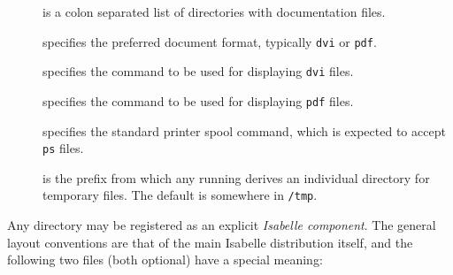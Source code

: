 \begin{isabellebody}
\begin{isamarkuptext}
\begin{description}
  \item[\hypertarget{setting.ISABELLE-DOCS}{\hyperlink{setting.ISABELLE-DOCS}{\mbox{}}}] is a colon separated list of
  directories with documentation files.
  
  \item[\hypertarget{setting.ISABELLE-DOC-FORMAT}{\hyperlink{setting.ISABELLE-DOC-FORMAT}{\mbox{}}}] specifies the preferred
  document format, typically \verb|dvi| or \verb|pdf|.
  
  \item[\hypertarget{setting.DVI-VIEWER}{\hyperlink{setting.DVI-VIEWER}{\mbox{}}}] specifies the command to be used
  for displaying \verb|dvi| files.
  
  \item[\hypertarget{setting.PDF-VIEWER}{\hyperlink{setting.PDF-VIEWER}{\mbox{}}}] specifies the command to be used
  for displaying \verb|pdf| files.
  
  \item[\hypertarget{setting.PRINT-COMMAND}{\hyperlink{setting.PRINT-COMMAND}{\mbox{}}}] specifies the standard printer
  spool command, which is expected to accept \verb|ps| files.
  
  \item[\hypertarget{setting.ISABELLE-TMP-PREFIX}{\hyperlink{setting.ISABELLE-TMP-PREFIX}{\mbox{}}}] is the
  prefix from which any running \hyperlink{executable.isabelle-process}{\mbox{}}
  derives an individual directory for temporary files.  The default is
  somewhere in \verb|/tmp|.
  
  \end{description}%
\end{isamarkuptext}%
\isamarkuptrue%
%
\isamarkuptrue%
%
\begin{isamarkuptext}%
Any directory may be registered as an explicit \emph{Isabelle
  component}.  The general layout conventions are that of the main
  Isabelle distribution itself, and the following two files (both
  optional) have a special meaning:


\end{isamarkuptext}
\end{isabellebody}
